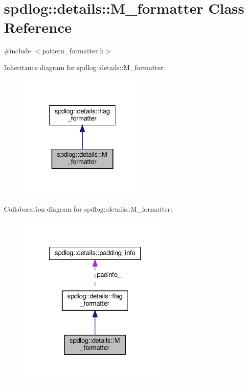 \hypertarget{classspdlog_1_1details_1_1_m__formatter}{}\section{spdlog\+:\+:details\+:\+:M\+\_\+formatter Class Reference}
\label{classspdlog_1_1details_1_1_m__formatter}


{\ttfamily \#include $<$pattern\+\_\+formatter.\+h$>$}



Inheritance diagram for spdlog\+:\+:details\+:\+:M\+\_\+formatter\+:
\nopagebreak
\begin{figure}[H]
\begin{center}
\leavevmode
\includegraphics[width=181pt]{classspdlog_1_1details_1_1_m__formatter__inherit__graph}
\end{center}
\end{figure}


Collaboration diagram for spdlog\+:\+:details\+:\+:M\+\_\+formatter\+:
\nopagebreak
\begin{figure}[H]
\begin{center}
\leavevmode
\includegraphics[width=220pt]{classspdlog_1_1details_1_1_m__formatter__coll__graph}
\end{center}
\end{figure}
